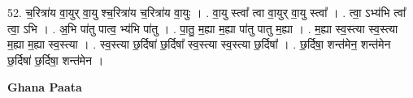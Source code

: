 \documentclass[17pt]{extarticle}
\begin{document}
52. च॒रित्रा॑य वा॒युर् वा॒यु श्च॒रित्रा॑य च॒रित्रा॑य वा॒युः । . वा॒यु स्त्वा᳚ त्वा वा॒युर् वा॒यु स्त्वा᳚ । . त्वा॒ ऽभ्य॑भि त्वा᳚ त्वा॒ ऽभि । . अ॒भि पा॑तु पात्व॒ भ्य॑भि पा॑तु । . पा॒तु॒ म॒ह्या म॒ह्या पा॑तु पातु म॒ह्या । . म॒ह्या स्व॒स्त्या स्व॒स्त्या म॒ह्या म॒ह्या स्व॒स्त्या । . स्व॒स्त्या छ॒र्दिषा॑ छ॒र्दिषा᳚ स्व॒स्त्या स्व॒स्त्या छ॒र्दिषा᳚ । . छ॒र्दिषा॒ शन्त॑मेन॒ शन्त॑मेन छ॒र्दिषा॑ छ॒र्दिषा॒ शन्त॑मेन । \newline

\textbf{Ghana Paata } \newline
\end{document}
